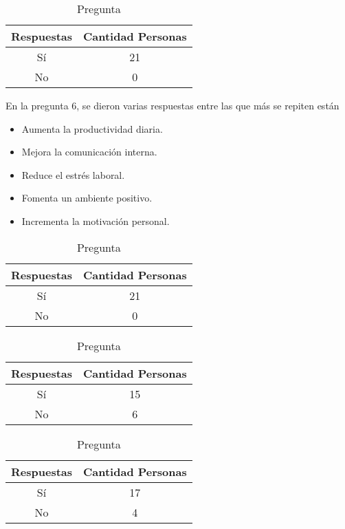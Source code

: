 \begin{enumerate}
\begin{table}
	\caption{Pregunta \thetable\label{pregunta5}}
\begin{tabular}{cc}
\hline
Respuestas & Cantidad Personas\\
\hline
S\'i & 21\\
No & 0\\
\hline
\end{tabular}
\end{table}
En la pregunta 6, se dieron varias respuestas entre las que más se repiten están
\begin{itemize}
\item Aumenta la productividad diaria. 
\item Mejora la comunicación interna. 
\item Reduce el estrés laboral. 
\item Fomenta un ambiente positivo. 
\item Incrementa la motivación personal.
\end{itemize}
\begin{table}
	\caption{Pregunta \thetable\label{pregunta7}}
\begin{tabular}{cc}
\hline
Respuestas & Cantidad Personas\\
\hline
S\'i & 21\\
No & 0\\
\hline
\end{tabular}
\end{table}
\begin{table}
	\caption{Pregunta \thetable\label{pregunta8}}
\begin{tabular}{cc}
\hline
Respuestas & Cantidad Personas\\
\hline
S\'i & 15\\
No & 6\\
\hline
\end{tabular}
\end{table}
\begin{table}
	\caption{Pregunta \thetable\label{pregunta9}}
\begin{tabular}{cc}
\hline
Respuestas & Cantidad Personas\\
\hline
S\'i & 17\\
No & 4\\
\hline
\end{tabular}
\end{table}
\end{enumerate}
